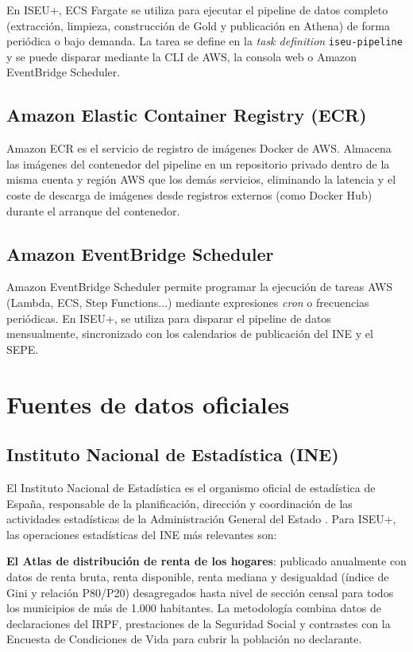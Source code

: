 En ISEU+, ECS Fargate se utiliza para ejecutar el pipeline de datos completo (extracción, limpieza, construcción de Gold y publicación en Athena) de forma periódica o bajo demanda. La tarea se define en la \textit{task definition} \texttt{iseu-pipeline} y se puede disparar mediante la CLI de AWS, la consola web o Amazon EventBridge Scheduler.

\subsection{Amazon Elastic Container Registry (ECR)}

Amazon ECR \parencite{AWS2023ECR} es el servicio de registro de imágenes Docker de AWS. Almacena las imágenes del contenedor del pipeline en un repositorio privado dentro de la misma cuenta y región AWS que los demás servicios, eliminando la latencia y el coste de descarga de imágenes desde registros externos (como Docker Hub) durante el arranque del contenedor.

\subsection{Amazon EventBridge Scheduler}

Amazon EventBridge Scheduler \parencite{AWS2023EventBridge} permite programar la ejecución de tareas AWS (Lambda, ECS, Step Functions...) mediante expresiones \textit{cron} o frecuencias periódicas. En ISEU+, se utiliza para disparar el pipeline de datos mensualmente, sincronizado con los calendarios de publicación del INE y el SEPE.

\section{Fuentes de datos oficiales}

\subsection{Instituto Nacional de Estadística (INE)}

El Instituto Nacional de Estadística es el organismo oficial de estadística de España, responsable de la planificación, dirección y coordinación de las actividades estadísticas de la Administración General del Estado \parencite{INE2023Institucional}. Para ISEU+, las operaciones estadísticas del INE más relevantes son:

\textbf{El Atlas de distribución de renta de los hogares}: publicado anualmente con datos de renta bruta, renta disponible, renta mediana y desigualdad (índice de Gini y relación P80/P20) desagregados hasta nivel de sección censal para todos los municipios de más de 1.000 habitantes. La metodología combina datos de declaraciones del IRPF, prestaciones de la Seguridad Social y contrastes con la Encuesta de Condiciones de Vida para cubrir la población no declarante.

